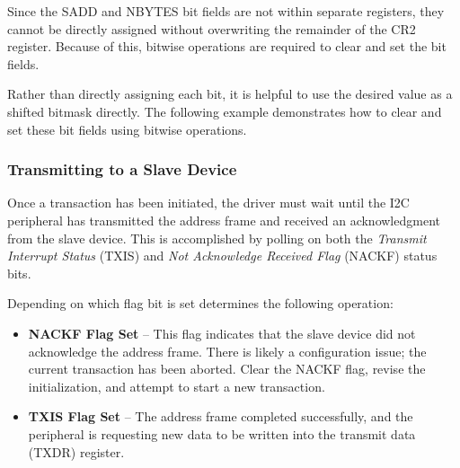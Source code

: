 \documentclass[11pt,fleqn]{book} %
\newcommand{\code}[3]{
    \begin{figure}[]
        \colorbox{gray!20!white}{
            \parbox{\linewidth-2\fboxsep} {
                \centering 
                
            }
        }
        \caption{#2}
        \label{#3}
    \end{figure}
}
\begin{document}
    \begin{example}
       
        Since the SADD and NBYTES bit fields are not within separate registers, they cannot be directly assigned without overwriting the remainder of the CR2 register. Because of this, bitwise operations are required to clear and set the bit fields. 
        
        Rather than directly assigning each bit, it is helpful to use the desired value as a shifted bitmask directly. The following example demonstrates how to clear and set these bit fields using bitwise operations. 
        
         \smallskip
         \colorbox{gray!20!white}{
             \parbox{\linewidth-2\fboxsep} {
                 \centering 
                 
             }
         }
     
         \smallskip
    \end{example}
    
    \subsubsection{Transmitting to a Slave Device}
        Once a transaction has been initiated, the driver must wait until the I2C peripheral has transmitted the address frame and received an acknowledgment from the slave device. This is accomplished by polling on both the \textit{Transmit Interrupt Status} (TXIS) and \textit{Not Acknowledge Received Flag} (NACKF) status bits. 
        
        Depending on which flag bit is set determines the following operation:
        \begin{itemize}
            \item \textbf{NACKF Flag Set} -- This flag indicates that the slave device did not acknowledge the address frame. There is likely a configuration issue; the current transaction has been aborted. Clear the NACKF flag, revise the initialization, and attempt to start a new transaction. 
            \item \textbf{TXIS Flag Set} -- The address frame completed successfully, and the peripheral is requesting new data to be written into the transmit data (TXDR) register. 
        \end{itemize}
        
\end{document}
